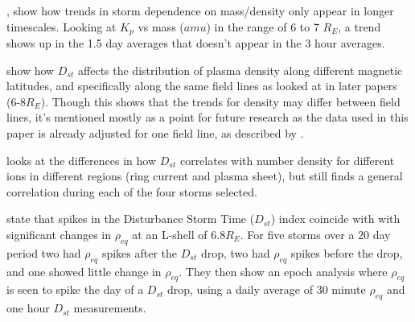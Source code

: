 \documentclass[10pt,twocolumn]{article}
\begin{document}
\cite{Takahashi2006}, show how trends in storm dependence on mass/density only appear in longer timescales. Looking at $K_p$ vs mass ($amu$) in the range of 6 to 7 $R_E$, a trend shows up in the 1.5 day averages that doesn't appear in the 3 hour averages.

\cite{Denton2006} show how $D_{st}$ affects the distribution of plasma density along different magnetic latitudes, and specifically along the same field lines as looked at in later papers (6-8$R_E$). Though this shows that the trends for density may differ between field lines, it's mentioned mostly as a point for future research as the data used in this paper is already adjusted for one field line, as described by \cite{Takahashi2010}.

\cite{Yao2008} looks at the differences in how $D_{st}$ correlates with number density for different ions in different regions (ring current and plasma sheet), but still finds a general correlation during each of the four storms selected.

\cite{Takahashi2010} state that spikes in the Disturbance Storm Time ($D_{st}$) index coincide with with significant changes in $\rho_{eq}$ at an L-shell of 6.8$R_E$. For five storms over a 20 day period two had $\rho_{eq}$ spikes after the $D_{st}$ drop, two had $\rho_{eq}$ spikes before the drop, and one showed little change in $\rho_{eq}$. They then show an epoch analysis where $\rho_{eq}$ is seen to spike the day of a $D_{st}$ drop, using a daily average of 30 minute $\rho_{eq}$ and one hour $D_{st}$ measurements. 


\end{document}
